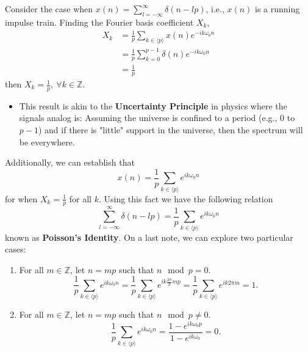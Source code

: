 \begin{example}
	Consider the case when $x(n) = \sum_{l=-\infty}^{\infty} \delta(n-lp)$, i.e., $x(n)$ is a
	running impulse train. Finding the Fourier basis coefficient $X_{k}$,
	\begin{align*}
		X_{k} & = \frac{1}{p}\sum_{k \in \langle p \rangle} x(n)e^{-ik\omega_0 n} \\
		      & = \frac{1}{p}\sum_{k=0}^{p-1} \delta(n)e^{-ik\omega_0 n}          \\
		      & = \frac{1}{p}
	\end{align*}
	then $X_{k} = \frac{1}{p},\ \forall k \in \mathbb{Z}$.
	\begin{itemize}
		\item This result is akin to the \textbf{Uncertainty Principle}
		      in physics where the signals analog is: Assuming the universe is confined to a period
		      (e.g., $0$ to $p-1$) and if there is "little" support in the universe, then the spectrum
		      will be everywhere.
	\end{itemize}
	Additionally, we can establish that
	\[
		x(n) = \frac{1}{p}\sum_{k \in \langle p \rangle} e^{ik\omega_0 n}
	\]
	for when $X_{k} = \frac{1}{p}$ for all $k$. Using this fact we have the following relation
	\begin{equation}
		\sum_{l=-\infty}^{\infty} \delta(n-lp) = \frac{1}{p}\sum_{k \in \langle p \rangle} e^{ik\omega_0 n}
	\end{equation}
	known as \textbf{Poisson's Identity}. On a last note, we can explore two particular cases:
	\begin{enumerate}
		\item For all $m \in \mathbb{Z}$, let $n = mp$ such that $n \mod p = 0$.
		      \[
			      \frac{1}{p}\sum_{k \in \langle p \rangle} e^{ik\omega_0 n} = \frac{1}{p}\sum_{k \in \langle p \rangle} e^{ik \frac{2\pi}{p} mp}
			      = \frac{1}{p}\sum_{k \in \langle p \rangle} e^{ik 2\pi m} = 1
			      .\]
		\item For all $m \in \mathbb{Z}$, let $n = mp$ such that $n \mod p \neq 0$.
		      \[
			      \frac{1}{p}\sum_{k \in \langle p \rangle} e^{ik\omega_0 n} = \frac{1-e^{ik\omega_0 p}}{1 - e^{ik\omega_0}} = 0
			      .\]
	\end{enumerate}
\end{example}
